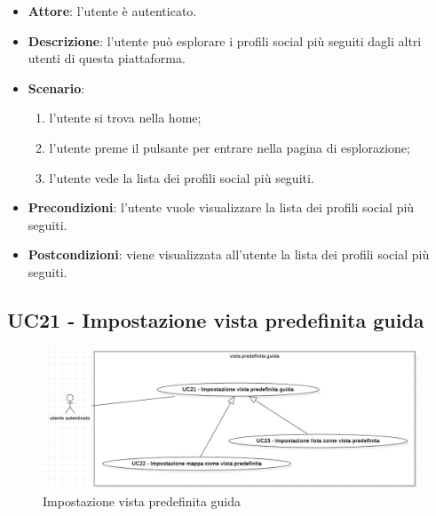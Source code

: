 \begin{itemize}
    \item \textbf{Attore}: l'utente è autenticato.
    \item \textbf{Descrizione}: l'utente può esplorare i profili social più seguiti dagli altri utenti di questa piattaforma.
    \item \textbf{Scenario}:
    \begin{enumerate}
        \item l'utente si trova nella home;
        \item l'utente preme il pulsante per entrare nella pagina di esplorazione;
        \item l'utente vede la lista dei profili social più seguiti.
    \end{enumerate}
    \item \textbf{Precondizioni}: l'utente vuole visualizzare la lista dei profili social più seguiti.
    \item \textbf{Postcondizioni}: viene visualizzata all'utente la lista dei profili social più seguiti.
\end{itemize}

\subsection{UC21 - Impostazione vista predefinita guida}
\begin{figure}[!h]
    \includegraphics[width=15cm]{sezioni/Images/UC20_s.png}
    \centering
    \caption{Impostazione vista predefinita guida}
\end{figure}

